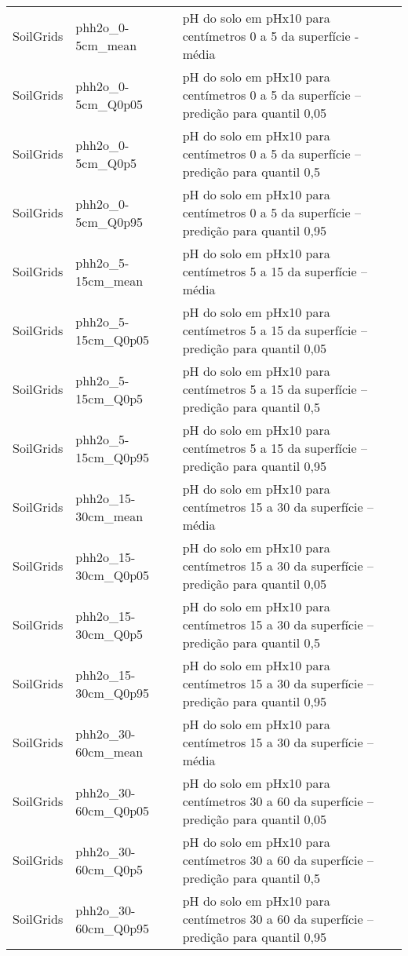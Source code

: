 \begin{longtable}{@{} p{4cm} p{4cm} p{8cm} @{}}
	SoilGrids &
	phh2o\_0-5cm\_mean &
	pH do solo em pHx10 para centímetros 0 a 5 da superfície - média \\
	SoilGrids &
	phh2o\_0-5cm\_Q0p05 &
	pH do solo em pHx10 para centímetros 0 a 5 da superfície – predição para quantil 0,05 \\
	SoilGrids &
	phh2o\_0-5cm\_Q0p5 &
	pH do solo em pHx10 para centímetros 0 a 5 da superfície – predição para quantil 0,5 \\
	SoilGrids &
	phh2o\_0-5cm\_Q0p95 &
	pH do solo em pHx10 para centímetros 0 a 5 da superfície – predição para quantil 0,95 \\
	SoilGrids &
	phh2o\_5-15cm\_mean &
	pH do solo em pHx10 para centímetros 5 a 15 da superfície – média \\
	SoilGrids &
	phh2o\_5-15cm\_Q0p05 &
	pH do solo em pHx10 para centímetros 5 a 15 da superfície – predição para quantil 0,05 \\
	SoilGrids &
	phh2o\_5-15cm\_Q0p5 &
	pH do solo em pHx10 para centímetros 5 a 15 da superfície – predição para quantil 0,5 \\
	SoilGrids &
	phh2o\_5-15cm\_Q0p95 &
	pH do solo em pHx10 para centímetros 5 a 15 da superfície – predição para quantil 0,95 \\
	SoilGrids &
	phh2o\_15-30cm\_mean &
	pH do solo em pHx10 para centímetros 15 a 30 da superfície – média \\
	SoilGrids &
	phh2o\_15-30cm\_Q0p05 &
	pH do solo em pHx10 para centímetros 15 a 30 da superfície – predição para quantil 0,05 \\
	SoilGrids &
	phh2o\_15-30cm\_Q0p5 &
	pH do solo em pHx10 para centímetros 15 a 30 da superfície – predição para quantil 0,5 \\
	SoilGrids &
	phh2o\_15-30cm\_Q0p95 &
	pH do solo em pHx10 para centímetros 15 a 30 da superfície – predição para quantil 0,95 \\
	SoilGrids &
	phh2o\_30-60cm\_mean &
	pH do solo em pHx10 para centímetros 15 a 30 da superfície – média \\
	SoilGrids &
	phh2o\_30-60cm\_Q0p05 &
	pH do solo em pHx10 para centímetros 30 a 60 da superfície – predição para quantil 0,05 \\
	SoilGrids &
	phh2o\_30-60cm\_Q0p5 &
	pH do solo em pHx10 para centímetros 30 a 60 da superfície – predição para quantil 0,5 \\
	SoilGrids &
	phh2o\_30-60cm\_Q0p95 &
	pH do solo em pHx10 para centímetros 30 a 60 da superfície – predição para quantil 0,95 \\

\end{longtable}
